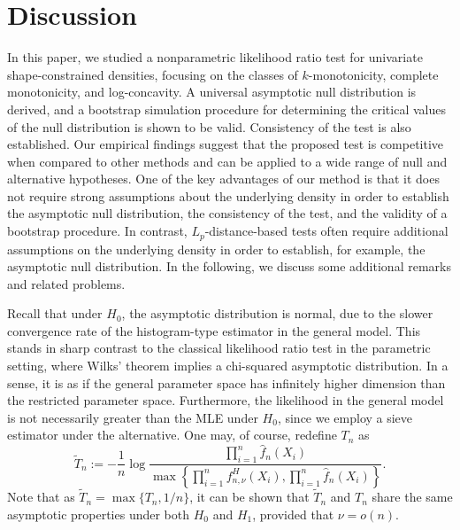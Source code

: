 \documentclass[12pt,letterpaper, twoside, openany]{article}
\theoremstyle{plain}
\begin{document}
\section{Discussion}\label{sect:discussion}
In this paper, we studied a nonparametric likelihood ratio test for univariate shape-constrained densities, focusing on the classes of $k$-monotonicity, complete monotonicity, and log-concavity. A universal asymptotic null distribution is derived, and a bootstrap simulation procedure for determining the critical values of the null distribution is shown to be valid. Consistency of the test is also established. Our empirical findings suggest  that the proposed test is competitive when compared to  other methods and can be applied to a wide range of null and alternative hypotheses. One of the key advantages of our method is that it does not require strong assumptions about the underlying density in order to establish the asymptotic null distribution, the consistency of the test, and the validity of a bootstrap procedure. In contrast, $L_p$-distance-based tests often require additional assumptions on the underlying density in order to establish, for example, the asymptotic null distribution.    In the following, we discuss some additional remarks and related problems.


Recall that under $H_0$, the asymptotic distribution is normal, due to the slower convergence rate of the histogram-type estimator in the general model. This stands in sharp contrast to the classical likelihood ratio test in the parametric setting, where Wilks’ theorem implies a chi-squared asymptotic distribution. In a sense, it is as if the general parameter space has infinitely higher dimension than the restricted parameter space. Furthermore, the likelihood in the general model is not necessarily greater than the MLE under $H_0$, since we employ a sieve estimator under the alternative. One may, of course, redefine $T_n$ as
\begin{equation*}
    \tilde{T}_n := -\frac{1}{n} \log \frac{\prod_{i=1}^n \hat{f}_n(X_i)}{\max\left\{ \prod_{i=1}^n f^H_{n,\nu}(X_i), \prod_{i=1}^n \hat{f}_n(X_i) \right\}}.
\end{equation*}
Note that as $\tilde{T}_n = \max\{T_n, 1/n\}$,  it can be shown that $\tilde{T}_n$ and $T_n$ share the same asymptotic properties under both $H_0$ and $H_1$, provided that $\nu = o(n)$.


		
\end{document}
